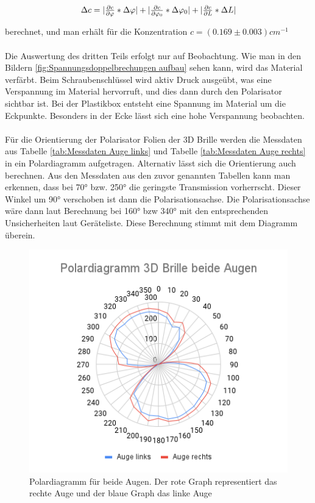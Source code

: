 \documentclass[12pt,a4paper,twoside]{article}
\begin{document}
\begin{equation}
    \label{eq:zucker unsicherheit}
    \centerline{$ \Delta c = \vert \frac{\partial c}{\partial \varphi} * \Delta \varphi \vert +  \vert \frac{\partial c}{\partial \varphi_0} * \Delta \varphi_0 \vert + \vert \frac{\partial c}{\partial L} * \Delta L \vert$}
\end{equation}

\noindent
berechnet, und man erhält für die Konzentration $c = (0.169 \pm 0.003) cm^{-1}$
\\
\\
Die Auswertung des dritten Teils erfolgt nur auf Beobachtung. Wie man in den Bildern \ref{fig:Spannungsdoppelbrechungen aufbau} sehen kann, wird das Material verfärbt. 
Beim Schraubenschlüssel wird aktiv Druck ausgeübt, was eine Verspannung im Material hervorruft, und dies dann durch den Polarisator sichtbar ist. 
Bei der Plastikbox entsteht eine Spannung im Material um die Eckpunkte. Besonders in der Ecke lässt sich eine hohe Verspannung beobachten. 
\\
\\
Für die Orientierung der Polarisator Folien der 3D Brille werden die Messdaten aus Tabelle \ref{tab:Messdaten Auge links} und Tabelle \ref{tab:Messdaten Auge rechts} in ein Polardiagramm aufgetragen. 
Alternativ lässt sich die Orientierung auch berechnen. Aus den Messdaten aus den zuvor genannten Tabellen kann man erkennen, dass bei 70° bzw. 250° die geringste Transmission vorherrscht. Dieser Winkel um 90° verschoben ist dann die Polarisationsachse. 
Die Polarisationsachse wäre dann laut Berechnung bei 160° bzw 340° mit den entsprechenden Unsicherheiten laut Geräteliste. 
Diese Berechnung stimmt mit dem Diagramm überein. 

\begin{figure}[H]
    \centering
    \includegraphics[width=0.6\linewidth]{nudes/Polardiagramm 3D Brille beide Augen.png}
    \caption{Polardiagramm für beide Augen. Der rote Graph representiert das rechte Auge und der blaue Graph das linke Auge}
    \label{fig:Polardiagramm}
\end{figure}
\end{document}
